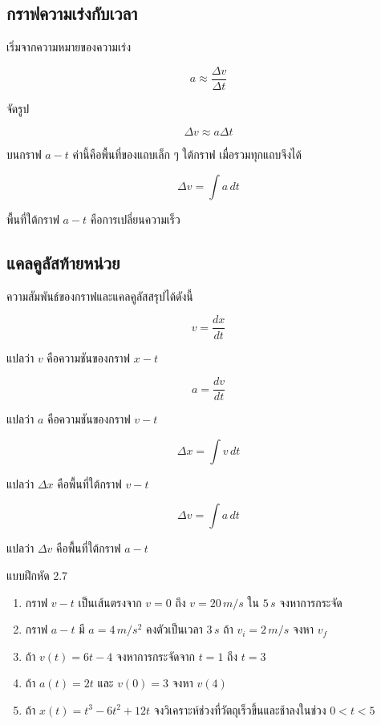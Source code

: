 \documentclass[12pt,a4paper]{report}
\begin{document}
\subsection{กราฟความเร่งกับเวลา}

เริ่มจากความหมายของความเร่ง

\[
a\approx \frac{\Delta v}{\Delta t}
\]

จัดรูป

\[
\Delta v\approx a\Delta t
\]

บนกราฟ $a-t$ ค่านี้คือพื้นที่ของแถบเล็ก ๆ ใต้กราฟ เมื่อรวมทุกแถบจึงได้

\[
\Delta v=\int a\,dt
\]

\begin{tcolorbox}[title=สรุปกราฟ $a-t$]
พื้นที่ใต้กราฟ $a-t$ คือการเปลี่ยนความเร็ว
\end{tcolorbox}

\subsection{แคลคูลัสท้ายหน่วย}

ความสัมพันธ์ของกราฟและแคลคูลัสสรุปได้ดังนี้

\[
v=\frac{dx}{dt}
\]

แปลว่า $v$ คือความชันของกราฟ $x-t$

\[
a=\frac{dv}{dt}
\]

แปลว่า $a$ คือความชันของกราฟ $v-t$

\[
\Delta x=\int v\,dt
\]

แปลว่า $\Delta x$ คือพื้นที่ใต้กราฟ $v-t$

\[
\Delta v=\int a\,dt
\]

แปลว่า $\Delta v$ คือพื้นที่ใต้กราฟ $a-t$
\begin{exercisebox}{แบบฝึกหัด 2.7}
\begin{enumerate}
    \item กราฟ $v-t$ เป็นเส้นตรงจาก $v=0$ ถึง $v=20\,\si{m/s}$ ใน $5\,\si{s}$ จงหาการกระจัด
    \item กราฟ $a-t$ มี $a=4\,\si{m/s^2}$ คงตัวเป็นเวลา $3\,\si{s}$ ถ้า $v_i=2\,\si{m/s}$ จงหา $v_f$
    \item ถ้า $v(t)=6t-4$ จงหาการกระจัดจาก $t=1$ ถึง $t=3$
    \item ถ้า $a(t)=2t$ และ $v(0)=3$ จงหา $v(4)$
    \item ถ้า $x(t)=t^3-6t^2+12t$ จงวิเคราะห์ช่วงที่วัตถุเร็วขึ้นและช้าลงในช่วง $0<t<5$
\end{enumerate}
\end{exercisebox}
\end{document}
